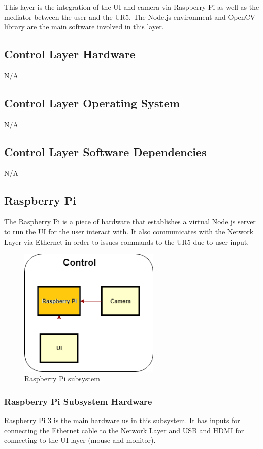 This layer is the integration of the UI and camera via Raspberry Pi as well as the mediator between the user and the UR5. The Node.js environment and OpenCV library are the main software involved in this layer.

\subsection{Control Layer Hardware}
N/A

\subsection{Control Layer Operating System}
N/A

\subsection{Control Layer Software Dependencies}
N/A

\subsection{Raspberry Pi}
The Raspberry Pi is a piece of hardware that establishes a virtual Node.js server to run the UI for the user interact with.  It also communicates with the Network Layer via Ethernet in order to issues commands to the UR5 due to user input.

\begin{figure}[h!]
	\centering
 	\includegraphics[width=0.60\textwidth]{images/Control_Layer_Raspberry_Pi}
 \caption{Raspberry Pi subsystem}
\end{figure}

\subsubsection{Raspberry Pi Subsystem Hardware}
Raspberry Pi 3 is the main hardware us in this subsystem. It has inputs for connecting the Ethernet cable to the Network Layer and USB and HDMI for connecting to the UI layer (mouse and monitor).

